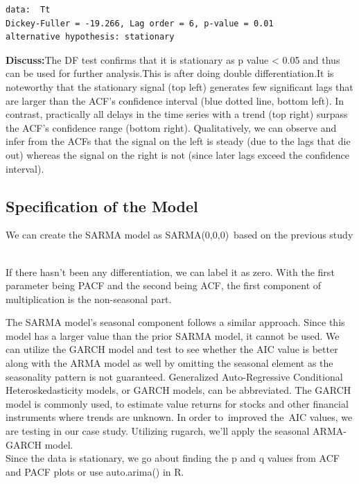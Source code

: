 \documentclass[12pt,a4paper]{book}
\begin{document}
{\begin{verbatim}
data:  Tt
Dickey-Fuller = -19.266, Lag order = 6, p-value = 0.01
alternative hypothesis: stationary
\end{verbatim}

\textbf{Discuss:}The DF test confirms that it is stationary as p value
\textless{} 0.05 and thus can be used for further analysis.This is after
doing double differentiation.It is noteworthy that the stationary signal
(top left) generates few significant lags that are larger than the ACF's
confidence interval (blue dotted line, bottom left). In contrast,
practically all delays in the time series with a trend (top right)
surpass the ACF's confidence range (bottom right). Qualitatively, we can
observe and infer from the ACFs that the signal on the left is steady
(due to the lags that die out) whereas the signal on the right is not
(since later lags exceed the confidence interval).

\hypertarget{specification-of-the-model}{%
\subsection{Specification of the
Model}\label{specification-of-the-model}}

We can create the SARMA model as SARMA(0,0,0)~based on the previous
study ~

If there hasn't been any differentiation, we can label it as zero. With
the first parameter being PACF and the second being ACF, the first
component of multiplication is the non-seasonal part.

The SARMA model's seasonal component follows a similar approach. Since
this model has a larger value than the prior SARMA model, it cannot be
used. We can utilize the GARCH model and test to see whether the AIC
value is better along with the ARMA model as well by omitting the
seasonal element as the seasonality pattern is not guaranteed.
Generalized Auto-Regressive Conditional Heteroskedasticity models, or
GARCH models, can be abbreviated. The GARCH model is commonly used, to
estimate value returns for stocks and other financial instruments where
trends are unknown. In order to~improved the~AIC values, we are testing
in our case study. Utilizing rugarch, we'll apply the seasonal
ARMA-GARCH model.\\
Since the data is stationary, we go about finding the p and q values
from ACF and PACF plots or use auto.arima() in R.

\begin{Shaded}
\begin{Highlighting}[]
\end{Highlighting}
\end{Shaded}

}
\end{document}
